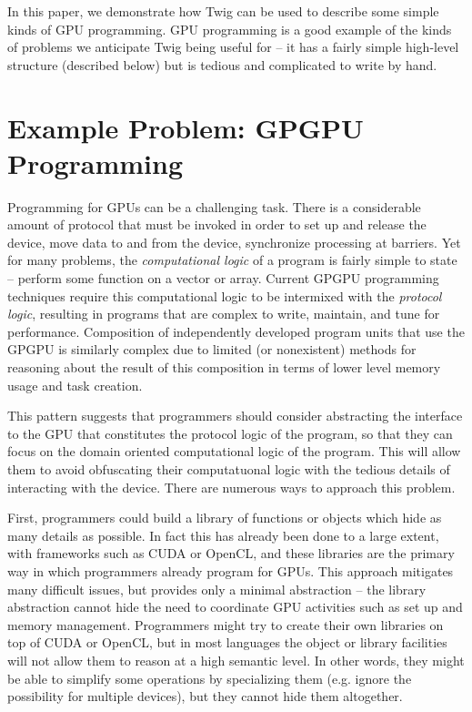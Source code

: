 \documentclass[11pt]{article}
\begin{document}
In this paper, we demonstrate how Twig can be used to describe some simple
kinds of GPU programming. GPU programming is a good example of the kinds of
problems we anticipate Twig being useful for -- it has a fairly simple
high-level structure (described below) but is tedious and complicated to write
by hand. %

\section{Example Problem: GPGPU Programming}

Programming for GPUs can be a challenging task. There is a
considerable amount of protocol that must be invoked in order to set
up and release the device, move data to and from the device,
synchronize processing at barriers. Yet for many problems, the
\emph{computational logic} of a program is fairly simple to state --
perform some function on a vector or array.  Current GPGPU programming
techniques require this computational logic to be intermixed with the
\emph{protocol logic}, resulting in programs that are complex to write,
maintain, and tune for performance.  Composition of independently developed
program units that use the GPGPU is similarly complex due to limited (or
nonexistent) methods for reasoning about the result of this composition in
terms of lower level memory usage and task creation.

This pattern suggests that programmers should consider abstracting the
interface to the GPU that constitutes the protocol logic of the
program, so that they can focus on the domain oriented computational
logic of the program.  This will allow them to avoid obfuscating their
computatuonal logic with the tedious details of interacting with the
device. There are numerous ways to approach this problem.

First, programmers could build a library of functions or objects which hide as
many details as possible. In fact this has already been done to a large
extent, with frameworks such as CUDA or OpenCL, and these libraries are the
primary way in which programmers already program for GPUs. This approach
mitigates many difficult issues, but provides only a minimal abstraction --
the library abstraction cannot hide the need to coordinate GPU activities such
as set up and memory management. Programmers might try to create their own
libraries on top of CUDA or OpenCL, but in most languages the object or
library facilities will not allow them to reason at a high semantic level. In
other words, they might be able to simplify some operations by specializing
them (e.g. ignore the possibility for multiple devices), but they cannot hide
them altogether.
\end{document}
